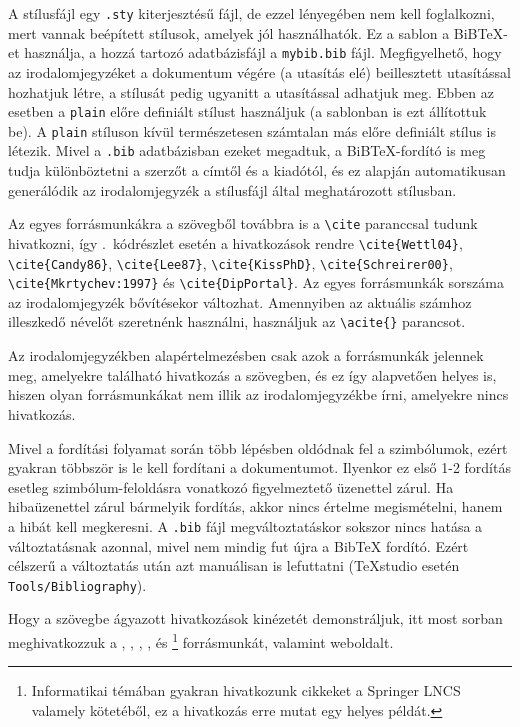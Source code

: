 A stílusfájl egy \verb+.sty+ kiterjesztésű fájl, de ezzel lényegében nem kell foglalkozni, mert vannak beépített stílusok, amelyek jól használhatók. Ez a sablon a BiB\TeX-et használja, a hozzá tartozó adatbázisfájl a \verb+mybib.bib+ fájl. Megfigyelhető, hogy az irodalomjegyzéket a dokumentum végére (a \verb++ utasítás elé) beillesztett \verb++ utasítással hozhatjuk létre, a stílusát pedig ugyanitt a  \verb++ utasítással adhatjuk meg. Ebben az esetben a \verb+plain+ előre definiált stílust használjuk (a sablonban is ezt állítottuk be). A \verb+plain+ stíluson kívül természetesen számtalan más előre definiált stílus is létezik. Mivel a \verb+.bib+ adatbázisban ezeket megadtuk, a BiB\TeX-fordító is meg tudja különböztetni a szerzőt a címtől és a kiadótól, és ez alapján automatikusan generálódik az irodalomjegyzék a stílusfájl által meghatározott stílusban.

Az egyes forrásmunkákra a szövegből továbbra is a \verb+\cite+ paranccsal tudunk hivatkozni, így .~kódrészlet esetén a hivatkozások rendre \verb+\cite{Wettl04}+, \verb+\cite{Candy86}+, \verb+\cite{Lee87}+, \verb+\cite{KissPhD}+, \verb+\cite{Schreirer00}+,
\verb+\cite{Mkrtychev:1997}+ és \verb+\cite{DipPortal}+. Az egyes forrásmunkák sorszáma az irodalomjegyzék bővítésekor változhat. Amennyiben az aktuális számhoz illeszkedő névelőt szeretnénk használni, használjuk az \verb+\acite{}+ parancsot.

Az irodalomjegyzékben alapértelmezésben csak azok a forrásmunkák jelennek meg, amelyekre található hivatkozás a szövegben, és ez így alapvetően helyes is, hiszen olyan forrásmunkákat nem illik az irodalomjegyzékbe írni, amelyekre nincs hivatkozás.

Mivel a fordítási folyamat során több lépésben oldódnak fel a szimbólumok, ezért gyakran többször is le kell fordítani a dokumentumot. Ilyenkor ez első 1-2 fordítás esetleg szimbólum-feloldásra vonatkozó figyelmeztető üzenettel zárul. Ha hibaüzenettel zárul bármelyik fordítás, akkor nincs értelme megismételni, hanem a hibát kell megkeresni. A \verb+.bib+ fájl megváltoztatáskor sokszor nincs hatása a változtatásnak azonnal, mivel nem mindig fut újra a BibTeX fordító. Ezért célszerű a változtatás után azt manuálisan is lefuttatni (TeXstudio esetén \verb+Tools/Bibliography+).

Hogy a szövegbe ágyazott hivatkozások kinézetét demonstráljuk, itt most sorban meghivatkozzuk a \cite{Wettl04}, \cite{Candy86}, \cite{Lee87}, \cite{KissPhD}, \cite{Schreier00} és \footnote{Informatikai témában gyakran hivatkozunk cikkeket a Springer LNCS valamely kötetéből, ez a hivatkozás erre mutat egy helyes példát.} forrásmunkát, valamint  weboldalt.

